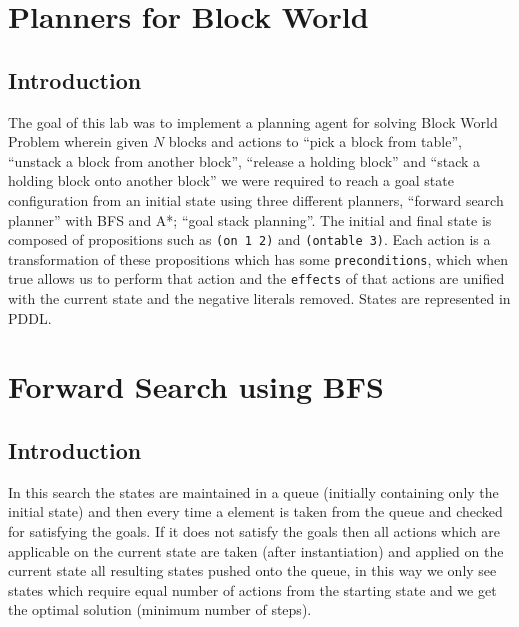 \documentclass{article}
\begin{document}
\maketitle
\section{Planners for Block World}
\subsection{Introduction}
The goal of this lab was to implement a planning agent for solving Block World Problem wherein given $N$ blocks and actions to ``pick a block from table'', ``unstack a block from another block'', ``release a holding block'' and ``stack a holding block onto another block'' we were required to reach a goal state configuration from an initial state using three different planners, ``forward search planner'' with BFS and A*; ``goal stack planning''. The initial and final state is composed of propositions such as \verb|(on 1 2)| and \verb|(ontable 3)|. Each action is a transformation of these propositions which has some \verb|preconditions|, which when true allows us to perform that action and the \verb|effects| of that actions are unified with the current state and the negative literals removed. States are represented in PDDL.

\section{Forward Search using BFS}
\subsection{Introduction}
In this search the states are maintained in a queue (initially containing only the initial state) and then every time a element is taken from the queue and checked for satisfying the goals. If it does not satisfy the goals then all actions which are applicable on the current state are taken (after instantiation) and applied on the current state all resulting states pushed onto the queue, in this way we only see states which require equal number of actions from the starting state and we get the optimal solution (minimum number of steps).

\pagebreak
\end{document}
